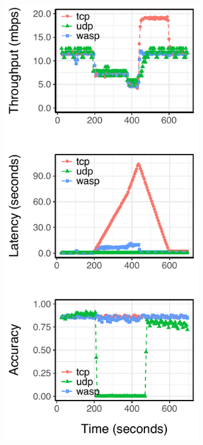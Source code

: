 \begin{figure}[t!]
  \centering
  \begin{subfigure}[t]{0.30\textwidth}
    \centering
    \includegraphics[width=0.95\textwidth]{figures/ped-runtime.pdf}

\end{subfigure}
\end{figure}
